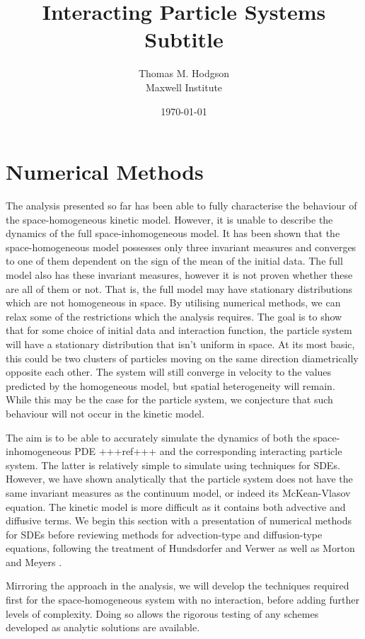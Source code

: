\documentclass[11pt, a4paper, draft]{article}
\title{{\huge Interacting Particle Systems} \\\vspace{1cm} Subtitle}
\author{Thomas M. Hodgson\\ \vspace{0.5cm} Maxwell Institute}
\date{\today}
\begin{document}
	\section{Numerical Methods}\label{sec:numericalmethods}
        The analysis presented so far has been able to fully characterise the behaviour of the space-homogeneous kinetic model. However, it is unable to describe the dynamics of the full space-inhomogeneous model. It has been shown that the space-homogeneous model possesses only three invariant measures and converges to one of them dependent on the sign of the mean of the initial data. The full model also has these invariant measures, however it is not proven whether these are all of them or not. That is, the full model may have stationary distributions which are not homogeneous in space. By utilising numerical methods, we can relax some of the restrictions which the analysis requires. The goal is to show that for some choice of initial data and interaction function, the particle system will have a stationary distribution that isn't uniform in space. At its most basic, this could be two clusters of particles moving on the same direction diametrically opposite each other. The system will still converge in velocity to the values predicted by the homogeneous model, but spatial heterogeneity will remain. While this may be the case for the particle system, we conjecture that such behaviour will not occur in the kinetic model.
        
        The aim is to be able to accurately simulate the dynamics of both the space-inhomogeneous PDE +++ref+++ and the corresponding interacting particle system. The latter is relatively simple to simulate using techniques for SDEs. However, we have shown analytically that the particle system does not have the same invariant measures as the continuum model, or indeed its McKean-Vlasov equation. The kinetic model is more difficult as it contains both advective and diffusive terms. We begin this section with a presentation of numerical methods for SDEs before reviewing methods for advection-type and diffusion-type equations, following the treatment of Hundsdorfer and Verwer \cite{Hundsdorfer2007} as well as Morton and Meyers \cite{Morton2005}.
        
        Mirroring the approach in the analysis, we will develop the techniques required first for the space-homogeneous system with no interaction, before adding further levels of complexity. Doing so allows the rigorous testing of any schemes developed as analytic solutions are available.
        
\end{document}
